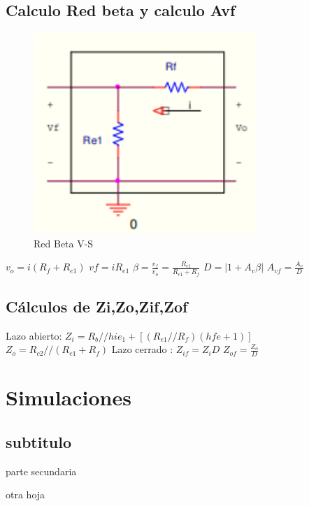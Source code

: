 \documentclass[12pt, letterpaper]{article}
\begin{document}
\subsection{Calculo Red beta y calculo Avf}
\begin{figure}[h]
    \centering
    \includegraphics[width=0.75\textwidth]{Imagenes/Screenshot_58.png}
    \caption{Red Beta  V-S}
    \label{fig:2.2.1}
\end{figure}
\singlespacing
$v_o=i(R_f+R_{e1})$ \hspace{1cm} $vf=iR_{e1}$
\singlespacing
$\beta = \frac{v_f}{v_o}=\frac{R_{e1}}{R_{e1}+R_f}$
\singlespacing
$D=|1+A_v\beta|$ \hspace{1cm} $A_{vf}=\frac{A_v}{D}$
\subsection{Cálculos de Zi,Zo,Zif,Zof}
Lazo abierto:
$Z_i=R_b//{hie_1+[(R_{e1}//R_f)(hfe+1)]}$
\singlespacing
$Z_o=R_{c2}//(R_{e1}+R_f)$
\singlespacing
Lazo cerrado :
$Z_{if}=Z_iD$
\singlespacing
$Z_{of}=\frac{Z_o}{D}$

\section{Simulaciones}


\subsection{subtitulo}

parte secundaria




\newpage
otra hoja

\label{LastPage}
\end{document}
